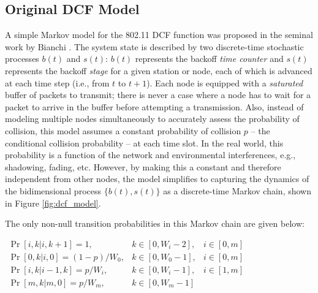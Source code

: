 \documentclass[conference]{IEEEtran}
\begin{document}
\subsection{Original DCF Model}
A simple Markov model for the 802.11 DCF function was proposed in the seminal work by Bianchi \cite{dcf}. The system state is described by two discrete-time stochastic processes $b(t)$ and $s(t)$: $b(t)$ represents the backoff \emph{time counter} and $s(t)$ represents the backoff \emph{stage} for a given station or node, each of which is advanced at each time step (i.e., from $t$ to $t + 1$). Each node is equipped with a \emph{saturated} buffer of packets to transmit; there is never a case where a node has to wait for a packet to arrive in the buffer before attempting a transmission. Also, instead of modeling multiple nodes simultaneously to accurately assess the probability of collision, this model assumes a constant probability of collision $p$ -- the conditional collision probability -- at each time slot. In the real world, this probability is a function of the network and environmental interferences, e.g., shadowing, fading, etc. However, by making this a constant and therefore independent from other nodes, the model simplifies to capturing the dynamics of the bidimensional process $\{ b(t), s(t) \}$ as a discrete-time Markov chain, shown in Figure \ref{fig:dcf_model}. 

The only non-null transition probabilities in this Markov chain are given below:

\begin{center}
\begin{math}
\boxed{
\begin{array}{lll}
\Pr[i,k | i, k + 1] = 1, & k \in [0, W_i - 2], & i \in [0,m] \\
\Pr[0,k | i, 0] = (1-p)/W_0, & k \in [0, W_0 - 1], & i \in [0,m] \\
\Pr[i,k | i-1, k] = p/W_i, & k \in [0, W_i - 1], & i \in [1,m] \\
\Pr[m,k | m,0] = p/W_m, & k \in [0, W_m - 1] & ~
\end{array}
}
\end{math}
\end{center}
\end{document}
